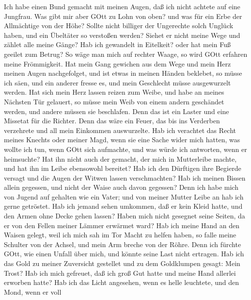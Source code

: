 Ich habe einen Bund gemacht mit meinen Augen, daß ich nicht
achtete auf eine Jungfrau.  Was gibt mir aber GOtt zu Lohn
von oben? und was für ein Erbe der Allmächtige von der Höhe?
 Sollte nicht billiger der Ungerechte solch Unglück haben,
und ein Übeltäter so verstoßen werden?  Siehet er nicht
meine Wege und zählet alle meine Gänge?  Hab ich gewandelt
in Eitelkeit? oder hat mein Fuß geeilet zum Betrug?  So wäge
man mich auf rechter Waage, so wird GOtt erfahren meine Frömmigkeit.
 Hat mein Gang gewichen aus dem Wege und mein Herz meinen
Augen nachgefolget, und ist etwas in meinen Händen beklebet,
 so müsse ich säen, und ein anderer fresse es, und mein
Geschlecht müsse ausgewurzelt werden.  Hat sich mein Herz
lassen reizen zum Weibe, und habe an meines Nächsten Tür gelauert,
 so müsse mein Weib von einem andern geschändet werden, und
andere müssen sie beschlafen.  Denn das ist ein Laster und
eine Missetat für die Richter.  Denn das wäre ein Feuer,
das bis ins Verderben verzehrete und all mein Einkommen auswurzelte.
 Hab ich verachtet das Recht meines Knechts oder meiner
Magd, wenn sie eine Sache wider mich hatten,  was wollte
ich tun, wenn GOtt sich aufmachte, und was würde ich antworten, wenn er
heimsuchte?  Hat ihn nicht auch der gemacht, der mich in
Mutterleibe machte, und hat ihn im Leibe ebensowohl bereitet?
 Hab ich den Dürftigen ihre Begierde versagt und die Augen
der Witwen lassen verschmachten?  Hab ich meinen Bissen
allein gegessen, und nicht der Waise auch davon gegessen? 
Denn ich habe mich von Jugend auf gehalten wie ein Vater; und von meiner
Mutter Leibe an hab ich gerne getröstet.  Hab ich jemand
sehen umkommen, daß er kein Kleid hatte, und den Armen ohne Decke gehen
lassen?  Haben mich nicht gesegnet seine Seiten, da er von
den Fellen meiner Lämmer erwärmet ward?  Hab ich meine Hand
an den Waisen gelegt, weil ich mich sah im Tor Macht zu helfen haben,
 so falle meine Schulter von der Achsel, und mein Arm
breche von der Röhre.  Denn ich fürchte GOtt, wie einen
Unfall über mich, und könnte seine Last nicht ertragen. 
Hab ich das Gold zu meiner Zuversicht gestellet und zu dem Goldklumpen
gesagt: Mein Trost?  Hab ich mich gefreuet, daß ich groß
Gut hatte und meine Hand allerlei erworben hatte?  Hab ich
das Licht angesehen, wenn es helle leuchtete, und den Mond, wenn er voll
